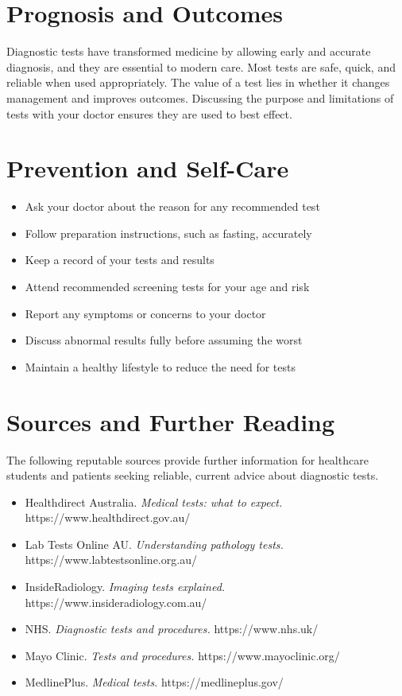 \section*{Prognosis and Outcomes}
Diagnostic tests have transformed medicine by allowing early and accurate diagnosis, and they are essential to modern care. Most tests are safe, quick, and reliable when used appropriately. The value of a test lies in whether it changes management and improves outcomes. Discussing the purpose and limitations of tests with your doctor ensures they are used to best effect.

\section*{Prevention and Self-Care}
\begin{itemize}
    \item Ask your doctor about the reason for any recommended test
    \item Follow preparation instructions, such as fasting, accurately
    \item Keep a record of your tests and results
    \item Attend recommended screening tests for your age and risk
    \item Report any symptoms or concerns to your doctor
    \item Discuss abnormal results fully before assuming the worst
    \item Maintain a healthy lifestyle to reduce the need for tests
\end{itemize}

\section*{Sources and Further Reading}
The following reputable sources provide further information for healthcare students and patients seeking reliable, current advice about diagnostic tests.

\begin{itemize}
    \item Healthdirect Australia. \textit{Medical tests: what to expect.} https://www.healthdirect.gov.au/
    \item Lab Tests Online AU. \textit{Understanding pathology tests.} https://www.labtestsonline.org.au/
    \item InsideRadiology. \textit{Imaging tests explained.} https://www.insideradiology.com.au/
    \item NHS. \textit{Diagnostic tests and procedures.} https://www.nhs.uk/
    \item Mayo Clinic. \textit{Tests and procedures.} https://www.mayoclinic.org/
    \item MedlinePlus. \textit{Medical tests.} https://medlineplus.gov/
\end{itemize}

